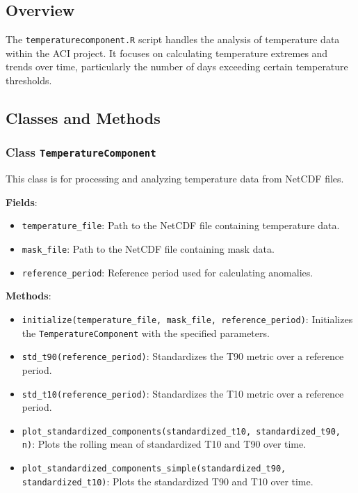 \documentclass[a4paper,12pt]{article}
\begin{document}
\subsection{Overview}
The \texttt{temperaturecomponent.R} script handles the analysis of temperature data within the ACI project. It focuses on calculating temperature extremes and trends over time, particularly the number of days exceeding certain temperature thresholds.

\subsection{Classes and Methods}

\subsubsection{Class \texttt{TemperatureComponent}}
This class is for processing and analyzing temperature data from NetCDF files.

\textbf{Fields}:
\begin{itemize}
    \item \texttt{temperature\_file}: Path to the NetCDF file containing temperature data.
    \item \texttt{mask\_file}: Path to the NetCDF file containing mask data.
    \item \texttt{reference\_period}: Reference period used for calculating anomalies.
\end{itemize}

\textbf{Methods}:

\begin{itemize}
    \item \texttt{initialize(temperature\_file, mask\_file, reference\_period)}: Initializes the \texttt{TemperatureComponent} with the specified parameters.
    
    \item \texttt{std\_t90(reference\_period)}: Standardizes the T90 metric over a reference period.
    
    \item \texttt{std\_t10(reference\_period)}: Standardizes the T10 metric over a reference period.
    
    \item \texttt{plot\_standardized\_components(standardized\_t10, standardized\_t90, n)}: Plots the rolling mean of standardized T10 and T90 over time.
    
    \item \texttt{plot\_standardized\_components\_simple(standardized\_t90, standardized\_t10)}: Plots the standardized T90 and T10 over time.
\end{itemize}
\end{document}
